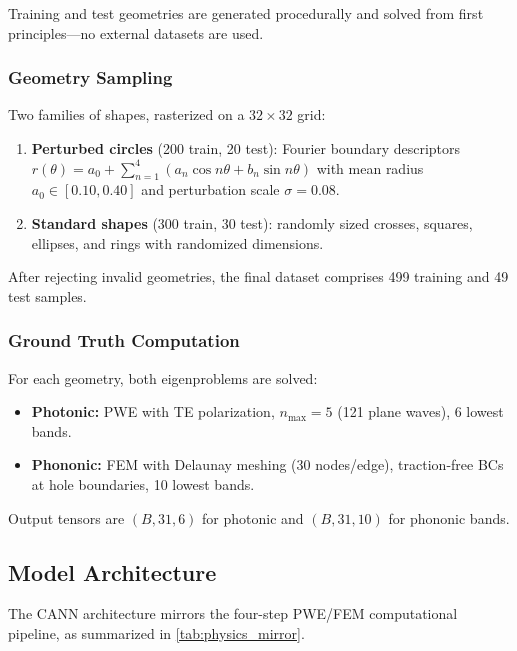 \documentclass[11pt]{article}
\begin{document}
Training and test geometries are generated procedurally and solved from first principles---no external datasets are used.

\subsubsection{Geometry Sampling}

Two families of shapes, rasterized on a $32 \times 32$ grid:
\begin{enumerate}
    \item \textbf{Perturbed circles} (200 train, 20 test): Fourier boundary descriptors $r(\theta) = a_0 + \sum_{n=1}^{4}(a_n \cos n\theta + b_n \sin n\theta)$ with mean radius $a_0 \in [0.10, 0.40]$ and perturbation scale $\sigma = 0.08$.
    \item \textbf{Standard shapes} (300 train, 30 test): randomly sized crosses, squares, ellipses, and rings with randomized dimensions.
\end{enumerate}

After rejecting invalid geometries, the final dataset comprises 499 training and 49 test samples.

\subsubsection{Ground Truth Computation}

For each geometry, both eigenproblems are solved:
\begin{itemize}
    \item \textbf{Photonic:} PWE with TE polarization, $n_\text{max} = 5$ (121 plane waves), 6 lowest bands.
    \item \textbf{Phononic:} FEM with Delaunay meshing (30 nodes/edge), traction-free BCs at hole boundaries, 10 lowest bands.
\end{itemize}
Output tensors are $(B, 31, 6)$ for photonic and $(B, 31, 10)$ for phononic bands.

\subsection{Model Architecture}
\label{sec:architecture}

The CANN architecture mirrors the four-step PWE/FEM computational pipeline, as summarized in \cref{tab:physics_mirror}.
\end{document}

